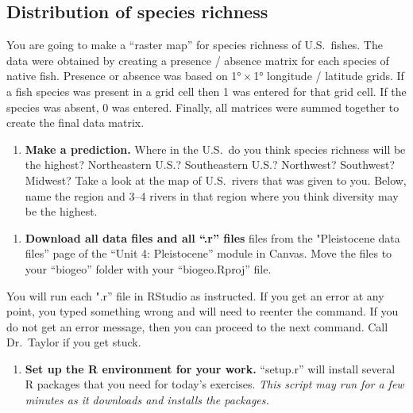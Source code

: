\documentclass[11pt]{article}
\newcommand*{\assignmentTitle}{Distribution of species richness}
\begin{document}
\thispagestyle{first_page}

\subsection*{\assignmentTitle}

You are going to make a “raster map” for species richness of U.S.~fishes. The data were
obtained by creating a presence / absence matrix for each species of
native fish. Presence or absence was based on 1°\,$\times$\,1° longitude /
latitude grids. If a fish species was present in a grid cell then 1 was
entered for that grid cell. If the species was absent, 0 was entered. Finally, all matrices were summed together to create
the final data matrix.

\begin{enumerate}%
\item \textbf{Make a prediction.} Where in the U.S.~do you think species richness will be the highest? Northeastern U.S.? Southeastern
U.S.? Northwest? Southwest? Midwest? Take a look at the map of U.S.~rivers that was given to you.  Below, name the region and 3--4 rivers in that 
region where you think diversity may be the highest.\vspace{10\baselineskip}
\end{enumerate}

\begin{enumerate}[resume]
\item \textbf{Download all data files and all ``.r'' files} files from the "Pleistocene data files” page of the “Unit 4: Pleistocene” module in Canvas. Move the files to your “biogeo” folder with your “biogeo.Rproj” file.
\end{enumerate}

You will run each ".r” file in RStudio as instructed. If you get an error at
any point, you typed something wrong and will need to reenter the
command. If you do not get an error message, then you can proceed to the
next command. Call Dr.~Taylor if you get stuck.


\begin{enumerate}[resume]
\item \textbf{Set up the R environment for your work.} “setup.r” will install several R packages that you need for today's exercises. \textit{This script may run for a few minutes as it downloads and installs the packages.}
\end{enumerate}
\end{document}
